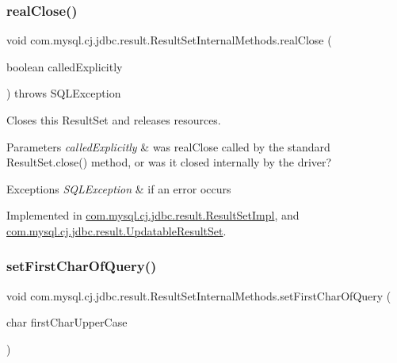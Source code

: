 \subsubsection{\texorpdfstring{real\+Close()}{realClose()}}
{\footnotesize\ttfamily void com.\+mysql.\+cj.\+jdbc.\+result.\+Result\+Set\+Internal\+Methods.\+real\+Close (\begin{DoxyParamCaption}\item[{boolean}]{called\+Explicitly }\end{DoxyParamCaption}) throws S\+Q\+L\+Exception}

Closes this Result\+Set and releases resources.


\begin{DoxyParams}{Parameters}
{\em called\+Explicitly} & was real\+Close called by the standard Result\+Set.\+close() method, or was it closed internally by the driver? \\
\hline
\end{DoxyParams}

\begin{DoxyExceptions}{Exceptions}
{\em S\+Q\+L\+Exception} & if an error occurs \\
\hline
\end{DoxyExceptions}


Implemented in \mbox{\hyperlink{classcom_1_1mysql_1_1cj_1_1jdbc_1_1result_1_1_result_set_impl_a33dfcef00d2e567cee58610ade647321}{com.\+mysql.\+cj.\+jdbc.\+result.\+Result\+Set\+Impl}}, and \mbox{\hyperlink{classcom_1_1mysql_1_1cj_1_1jdbc_1_1result_1_1_updatable_result_set_aa7c422ba94c2a8a8727c57160bd946bd}{com.\+mysql.\+cj.\+jdbc.\+result.\+Updatable\+Result\+Set}}.

\mbox{\label{interfacecom_1_1mysql_1_1cj_1_1jdbc_1_1result_1_1_result_set_internal_methods_a0cf0d8b631bb6bc7a7453ee35399889f}} 
\subsubsection{\texorpdfstring{set\+First\+Char\+Of\+Query()}{setFirstCharOfQuery()}}
{\footnotesize\ttfamily void com.\+mysql.\+cj.\+jdbc.\+result.\+Result\+Set\+Internal\+Methods.\+set\+First\+Char\+Of\+Query (\begin{DoxyParamCaption}\item[{char}]{first\+Char\+Upper\+Case }\end{DoxyParamCaption})}

